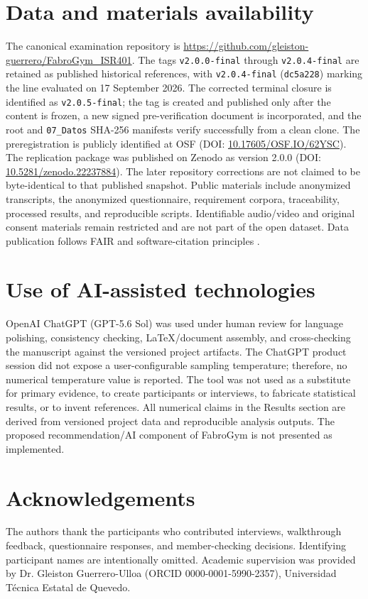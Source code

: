 \documentclass[pdflatex,sn-basic]{sn-jnl}
\begin{document}
\section*{Data and materials availability}
The canonical examination repository is \url{https://github.com/gleiston-guerrero/FabroGym_ISR401}. The tags \texttt{v2.0.0-final} through \texttt{v2.0.4-final} are retained as published historical references, with \texttt{v2.0.4-final} (\texttt{dc5a228}) marking the line evaluated on 17 September 2026. The corrected terminal closure is identified as \texttt{v2.0.5-final}; the tag is created and published only after the content is frozen, a new signed pre-verification document is incorporated, and the root and \texttt{07\_Datos} SHA-256 manifests verify successfully from a clean clone. The preregistration is publicly identified at OSF (DOI: \href{https://doi.org/10.17605/OSF.IO/62YSC}{10.17605/OSF.IO/62YSC}). The replication package was published on Zenodo as version 2.0.0 (DOI: \href{https://doi.org/10.5281/zenodo.22237884}{10.5281/zenodo.22237884}). The later repository corrections are not claimed to be byte-identical to that published snapshot. Public materials include anonymized transcripts, the anonymized questionnaire, requirement corpora, traceability, processed results, and reproducible scripts. Identifiable audio/video and original consent materials remain restricted and are not part of the open dataset. Data publication follows FAIR and software-citation principles \cite{wilkinson2016,smith2016,dicosmo2020}.

\section*{Use of AI-assisted technologies}
OpenAI ChatGPT (GPT-5.6 Sol) was used under human review for language polishing, consistency checking, LaTeX/document assembly, and cross-checking the manuscript against the versioned project artifacts. The ChatGPT product session did not expose a user-configurable sampling temperature; therefore, no numerical temperature value is reported. The tool was not used as a substitute for primary evidence, to create participants or interviews, to fabricate statistical results, or to invent references. All numerical claims in the Results section are derived from versioned project data and reproducible analysis outputs. The proposed recommendation/AI component of FabroGym is not presented as implemented.

\section*{Acknowledgements}
The authors thank the participants who contributed interviews, walkthrough feedback, questionnaire responses, and member-checking decisions. Identifying participant names are intentionally omitted. Academic supervision was provided by Dr. Gleiston Guerrero-Ulloa (ORCID 0000-0001-5990-2357), Universidad T{\'e}cnica Estatal de Quevedo.
\end{document}
